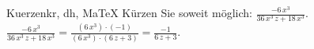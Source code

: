 \begin{MAufgabe}{Kuerzen}{kr, dh, MaTeX}
K\"urzen Sie soweit m\"oglich: $\frac{- 6\, x^3}{36\, x^3\, z + 18\, x^3}$.\\ 
\ifLsg\MLoesung
\quad $\frac{- 6\, x^3}{36\, x^3\, z + 18\, x^3}=\frac{(6\, x^3)\cdot(-1)}{(6\, x^3)\cdot(6\, z + 3)}=\frac{-1}{6\, z + 3}$.\else\relax\fi
 \end{MAufgabe}
